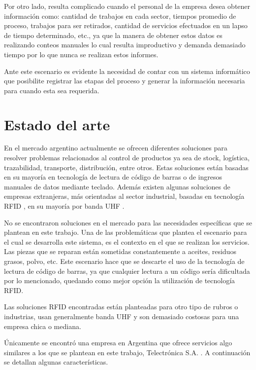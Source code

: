 Por otro lado, resulta complicado cuando el personal de la empresa desea obtener información como: cantidad de trabajos en cada sector, tiempos promedio de proceso, trabajos para ser retirados, cantidad de servicios efectuados en un lapso de tiempo determinado, etc., ya que la manera de obtener estos datos es realizando conteos manuales lo cual resulta improductivo y demanda demasiado tiempo por lo que nunca se realizan estos informes.

Ante este escenario es evidente la necesidad de contar con un sistema informático que posibilite registrar las etapas del proceso y generar la información necesaria para cuando esta sea requerida.


\section{Estado del arte}

En el mercado argentino actualmente se ofrecen diferentes soluciones para resolver problemas relacionados al control de productos ya sea de stock, logística, trazabilidad, transporte, distribución, entre otros. Estas soluciones están basadas en su mayoría en tecnología de lectura de código de barras o de ingresos manuales de datos mediante teclado. Además existen algunas soluciones de empresas extranjeras, más orientadas al sector industrial, basadas en tecnología RFID \citep{WEBSITE:RFID}, en su mayoría por banda UHF \citep{WEBSITE:UHF}.

No se encontraron soluciones en el mercado para las necesidades específicas que se plantean en este trabajo. Una de las problemáticas que plantea el escenario para el cual se desarrolla este sistema, es el contexto en el que se realizan los servicios. Las piezas que se reparan están sometidas constantemente a aceites, residuos grasos, polvo, etc. Este escenario hace que se descarte el uso de la tecnología de lectura de código de barras, ya que cualquier lectura a un código sería dificultada por lo mencionado, quedando como mejor opción la utilización de tecnología RFID.

Las soluciones RFID encontradas están planteadas para otro tipo de rubros o industrias, usan generalmente banda UHF y son demasiado costosas para una empresa chica o mediana. 

Únicamente se encontró una empresa en Argentina que ofrece servicios algo similares a los que se plantean en este trabajo, Telectrónica S.A. \citep{WEBSITE:TELECTRONICA}. A continuación se detallan algunas características.

